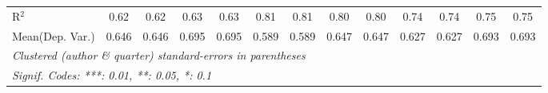 \begin{tabular}{lcccccccccccc}
   R$^2$                                    & 0.62         & 0.62    & 0.63    & 0.63    & 0.81          & 0.81    & 0.80        & 0.80    & 0.74         & 0.74          & 0.75    & 0.75\\  
Mean(Dep. Var.) & 0.646 & 0.646 & 0.695 & 0.695 & 0.589 & 0.589 & 0.647 & 0.647 & 0.627 & 0.627 & 0.693 & 0.693 \\
   \midrule \midrule
   \multicolumn{13}{l}{\emph{Clustered (author \& quarter) standard-errors in parentheses}}\\
   \multicolumn{13}{l}{\emph{Signif. Codes: ***: 0.01, **: 0.05, *: 0.1}}\\
\end{tabular}
\par\endgroup
